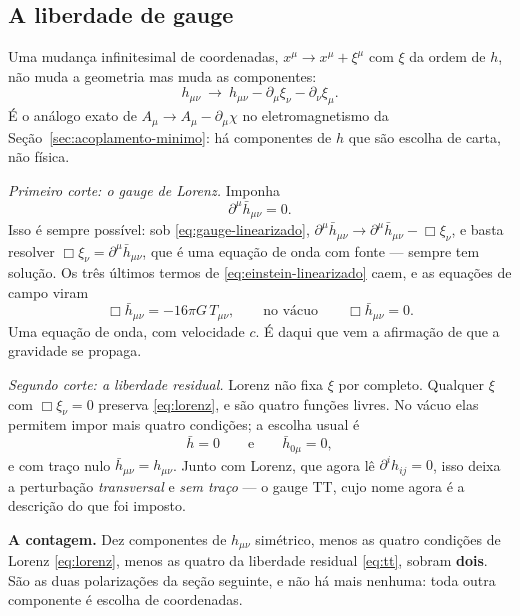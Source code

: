 \documentclass[12pt,a4paper,oneside]{book}
\theoremstyle{rgplain}
\theoremstyle{rgremark}
\begin{document}
\subsection*{A liberdade de gauge}

Uma mudança infinitesimal de coordenadas, $x^\mu\to x^\mu+\xi^\mu$ com
$\xi$ da ordem de $h$, não muda a geometria mas muda as componentes:
\begin{equation}
  h_{\mu\nu}\ \longrightarrow\ h_{\mu\nu}-\partial_\mu\xi_\nu
  -\partial_\nu\xi_\mu .
  \label{eq:gauge-linearizado}
\end{equation}
É o análogo exato de $A_\mu\to A_\mu-\partial_\mu\chi$ no eletromagnetismo da
Seção~\ref{sec:acoplamento-minimo}: há componentes de $h$ que são escolha de
carta, não física.

\emph{Primeiro corte: o gauge de Lorenz.} Imponha
\begin{equation}
  \partial^\mu\bar h_{\mu\nu}=0 .
  \label{eq:lorenz}
\end{equation}
Isso é sempre possível: sob \eqref{eq:gauge-linearizado},
$\partial^\mu\bar h_{\mu\nu}\to\partial^\mu\bar h_{\mu\nu}-\Box\xi_\nu$, e
basta resolver $\Box\xi_\nu=\partial^\mu\bar h_{\mu\nu}$, que é uma equação de
onda com fonte --- sempre tem solução. Os três últimos termos de
\eqref{eq:einstein-linearizado} caem, e as equações de campo viram
\begin{equation}
  \Box\bar h_{\mu\nu}=-16\pi G\,T_{\mu\nu} ,
  \qquad\text{no vácuo}\qquad
  \Box\bar h_{\mu\nu}=0 .
  \label{eq:onda-lorenz}
\end{equation}
Uma equação de onda, com velocidade $c$. É daqui que vem a afirmação de que a
gravidade se propaga.

\emph{Segundo corte: a liberdade residual.} Lorenz não fixa $\xi$ por
completo. Qualquer $\xi$ com $\Box\xi_\nu=0$ preserva \eqref{eq:lorenz}, e
são quatro funções livres. No vácuo elas permitem impor mais quatro
condições; a escolha usual é
\begin{equation}
  \bar h=0
  \qquad\text{e}\qquad
  \bar h_{0\mu}=0 ,
  \label{eq:tt}
\end{equation}
e com traço nulo $\bar h_{\mu\nu}=h_{\mu\nu}$. Junto com Lorenz, que agora lê
$\partial^i h_{ij}=0$, isso deixa a perturbação \emph{transversal} e
\emph{sem traço} --- o gauge TT, cujo nome agora é a descrição do que foi
imposto.

\begin{central}
\textbf{A contagem.} Dez componentes de $h_{\mu\nu}$ simétrico, menos as
quatro condições de Lorenz \eqref{eq:lorenz}, menos as quatro da liberdade
residual \eqref{eq:tt}, sobram \textbf{dois}. São as duas polarizações da
seção seguinte, e não há mais nenhuma: toda outra componente é escolha de
coordenadas.
\end{central}
\end{document}
